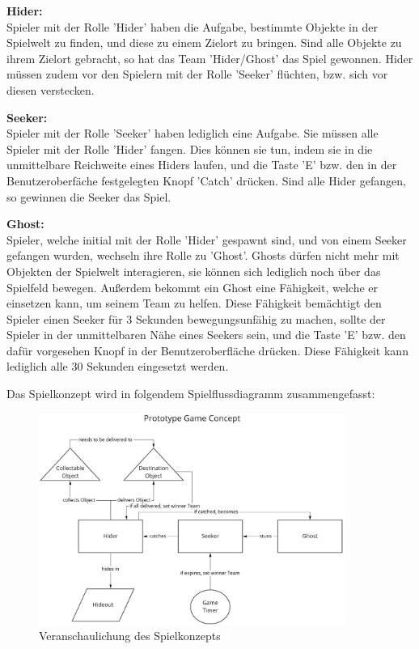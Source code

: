 \textbf{Hider:} \\
Spieler mit der Rolle 'Hider' haben die Aufgabe, bestimmte Objekte in der Spielwelt zu finden, und diese zu einem Zielort zu bringen. Sind alle Objekte zu ihrem Zielort gebracht, so hat das Team 'Hider/Ghost' das Spiel gewonnen. Hider müssen zudem vor den Spielern mit der Rolle 'Seeker' flüchten, bzw. sich vor diesen verstecken. 

\textbf{Seeker:} \\
Spieler mit der Rolle 'Seeker' haben lediglich eine Aufgabe. Sie müssen alle Spieler mit der Rolle 'Hider' fangen. Dies können sie tun, indem sie in die unmittelbare Reichweite eines Hiders laufen, und die Taste 'E' bzw. den in der Benutzeroberfäche festgelegten Knopf 'Catch' drücken. Sind alle Hider gefangen, so gewinnen die Seeker das Spiel.

\textbf{Ghost:} \\
Spieler, welche initial mit der Rolle 'Hider' gespawnt sind, und von einem Seeker gefangen wurden, wechseln ihre Rolle zu 'Ghost'. Ghosts dürfen nicht mehr mit Objekten der Spielwelt interagieren, sie können sich lediglich noch über das Spielfeld bewegen. Außerdem bekommt ein Ghost eine Fähigkeit, welche er einsetzen kann, um seinem Team zu helfen. Diese Fähigkeit bemächtigt den Spieler einen Seeker für 3 Sekunden bewegungsunfähig zu machen, sollte der Spieler in der unmittelbaren Nähe eines Seekers sein, und die Taste 'E' bzw. den dafür vorgesehen Knopf in der Benutzeroberfläche drücken. Diese Fähigkeit kann lediglich alle 30 Sekunden eingesetzt werden.

Das Spielkonzept wird in folgendem Spielflussdiagramm zusammengefasst:

\begin{figure}[H]
	\centering
	\includegraphics[width=100mm]{images/game_concept.jpg}
	\caption[Spielkonzept Diagramm]{Veranschaulichung des Spielkonzepts}
	\label{pic:game_concept}
\end{figure}

